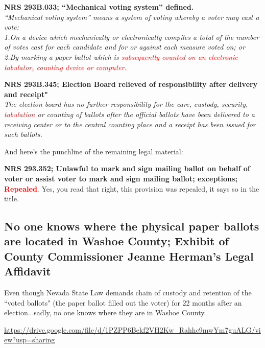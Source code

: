 \textbf{NRS 293B.033; “Mechanical voting system” defined.}\\
\textit{“Mechanical voting system” means a system of voting whereby a voter may cast a vote:\\
1.On a device which mechanically or electronically compiles a total of the number of votes cast for each candidate and for or against each measure voted on; or\\
2.By marking a paper ballot which is \textcolor{red}{subsequently counted on an electronic tabulator, counting device or computer.}}

\textbf{NRS 293B.345; Election Board relieved of responsibility after delivery and receipt"}\\
\textit{The election board has no further responsibility for the care, custody, security, \textcolor{red}{tabulation} or counting of ballots after the official ballots have been delivered to a receiving center or to the central counting place and a receipt has been issued for such ballots.}

And here's the punchline of the remaining legal material:

\textbf{NRS 293.352; Unlawful to mark and sign mailing ballot on behalf of voter or assist voter to mark and sign mailing ballot; exceptions; \textcolor{red}{Repealed}}. Yes, you read that right, this provision was repealed, it says so in the title.
\newpage
\subsection{No one knows where the physical paper ballots are located in Washoe County; Exhibit of County Commissioner 
 Jeanne Herman's Legal Affidavit}

Even though Nevada State Law demands chain of custody and retention of the ``voted ballots"  (the paper ballot filled out the voter) for 22 months after an election...sadly, no one knows where they are in Washoe County.

\url{https://drive.google.com/file/d/1PZPP6Bekf2VH2Kw_Rahhc9mwYm7guALG/view?usp=sharing}

